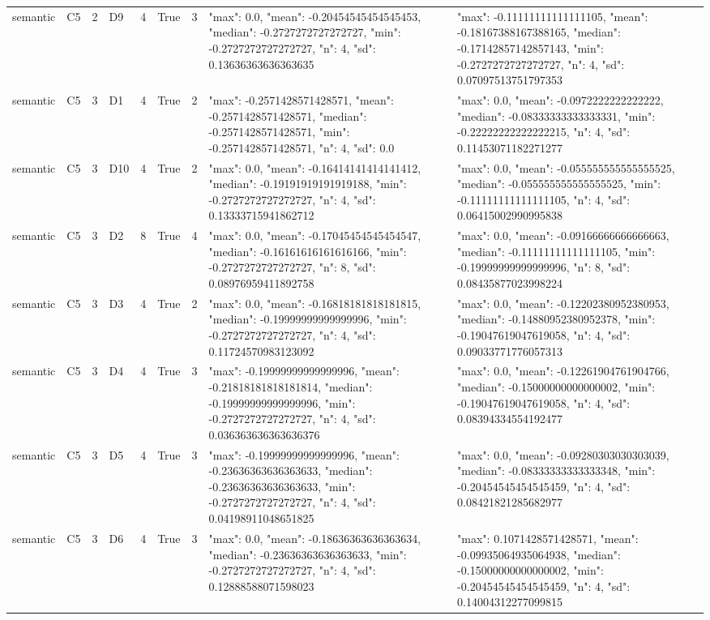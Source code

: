 \begin{tabular}{lllllllll}
semantic & C5 & 2 & D9 & 4 & True & 3 & {"max": 0.0, "mean": -0.20454545454545453, "median": -0.2727272727272727, "min": -0.2727272727272727, "n": 4, "sd": 0.13636363636363635} & {"max": -0.11111111111111105, "mean": -0.18167388167388165, "median": -0.17142857142857143, "min": -0.2727272727272727, "n": 4, "sd": 0.07097513751797353} \\
semantic & C5 & 3 & D1 & 4 & True & 2 & {"max": -0.2571428571428571, "mean": -0.2571428571428571, "median": -0.2571428571428571, "min": -0.2571428571428571, "n": 4, "sd": 0.0} & {"max": 0.0, "mean": -0.0972222222222222, "median": -0.08333333333333331, "min": -0.22222222222222215, "n": 4, "sd": 0.11453071182271277} \\
semantic & C5 & 3 & D10 & 4 & True & 2 & {"max": 0.0, "mean": -0.16414141414141412, "median": -0.19191919191919188, "min": -0.2727272727272727, "n": 4, "sd": 0.13333715941862712} & {"max": 0.0, "mean": -0.055555555555555525, "median": -0.055555555555555525, "min": -0.11111111111111105, "n": 4, "sd": 0.06415002990995838} \\
semantic & C5 & 3 & D2 & 8 & True & 4 & {"max": 0.0, "mean": -0.17045454545454547, "median": -0.16161616161616166, "min": -0.2727272727272727, "n": 8, "sd": 0.08976959411892758} & {"max": 0.0, "mean": -0.09166666666666663, "median": -0.11111111111111105, "min": -0.19999999999999996, "n": 8, "sd": 0.08435877023998224} \\
semantic & C5 & 3 & D3 & 4 & True & 2 & {"max": 0.0, "mean": -0.16818181818181815, "median": -0.19999999999999996, "min": -0.2727272727272727, "n": 4, "sd": 0.11724570983123092} & {"max": 0.0, "mean": -0.12202380952380953, "median": -0.14880952380952378, "min": -0.19047619047619058, "n": 4, "sd": 0.09033771776057313} \\
semantic & C5 & 3 & D4 & 4 & True & 3 & {"max": -0.19999999999999996, "mean": -0.21818181818181814, "median": -0.19999999999999996, "min": -0.2727272727272727, "n": 4, "sd": 0.036363636363636376} & {"max": 0.0, "mean": -0.12261904761904766, "median": -0.15000000000000002, "min": -0.19047619047619058, "n": 4, "sd": 0.08394334554192477} \\
semantic & C5 & 3 & D5 & 4 & True & 3 & {"max": -0.19999999999999996, "mean": -0.23636363636363633, "median": -0.23636363636363633, "min": -0.2727272727272727, "n": 4, "sd": 0.04198911048651825} & {"max": 0.0, "mean": -0.09280303030303039, "median": -0.08333333333333348, "min": -0.20454545454545459, "n": 4, "sd": 0.08421821285682977} \\
semantic & C5 & 3 & D6 & 4 & True & 3 & {"max": 0.0, "mean": -0.18636363636363634, "median": -0.23636363636363633, "min": -0.2727272727272727, "n": 4, "sd": 0.12888588071598023} & {"max": 0.1071428571428571, "mean": -0.09935064935064938, "median": -0.15000000000000002, "min": -0.20454545454545459, "n": 4, "sd": 0.14004312277099815} \\

\end{tabular}
